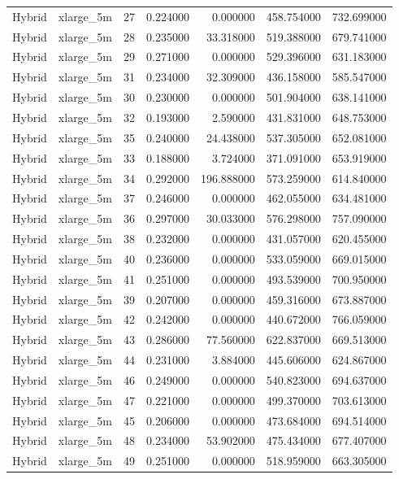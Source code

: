 \begin{tabular}{llrrrrr}
Hybrid & xlarge_5m & 27 & 0.224000 & 0.000000 & 458.754000 & 732.699000 \\
Hybrid & xlarge_5m & 28 & 0.235000 & 33.318000 & 519.388000 & 679.741000 \\
Hybrid & xlarge_5m & 29 & 0.271000 & 0.000000 & 529.396000 & 631.183000 \\
Hybrid & xlarge_5m & 31 & 0.234000 & 32.309000 & 436.158000 & 585.547000 \\
Hybrid & xlarge_5m & 30 & 0.230000 & 0.000000 & 501.904000 & 638.141000 \\
Hybrid & xlarge_5m & 32 & 0.193000 & 2.590000 & 431.831000 & 648.753000 \\
Hybrid & xlarge_5m & 35 & 0.240000 & 24.438000 & 537.305000 & 652.081000 \\
Hybrid & xlarge_5m & 33 & 0.188000 & 3.724000 & 371.091000 & 653.919000 \\
Hybrid & xlarge_5m & 34 & 0.292000 & 196.888000 & 573.259000 & 614.840000 \\
Hybrid & xlarge_5m & 37 & 0.246000 & 0.000000 & 462.055000 & 634.481000 \\
Hybrid & xlarge_5m & 36 & 0.297000 & 30.033000 & 576.298000 & 757.090000 \\
Hybrid & xlarge_5m & 38 & 0.232000 & 0.000000 & 431.057000 & 620.455000 \\
Hybrid & xlarge_5m & 40 & 0.236000 & 0.000000 & 533.059000 & 669.015000 \\
Hybrid & xlarge_5m & 41 & 0.251000 & 0.000000 & 493.539000 & 700.950000 \\
Hybrid & xlarge_5m & 39 & 0.207000 & 0.000000 & 459.316000 & 673.887000 \\
Hybrid & xlarge_5m & 42 & 0.242000 & 0.000000 & 440.672000 & 766.059000 \\
Hybrid & xlarge_5m & 43 & 0.286000 & 77.560000 & 622.837000 & 669.513000 \\
Hybrid & xlarge_5m & 44 & 0.231000 & 3.884000 & 445.606000 & 624.867000 \\
Hybrid & xlarge_5m & 46 & 0.249000 & 0.000000 & 540.823000 & 694.637000 \\
Hybrid & xlarge_5m & 47 & 0.221000 & 0.000000 & 499.370000 & 703.613000 \\
Hybrid & xlarge_5m & 45 & 0.206000 & 0.000000 & 473.684000 & 694.514000 \\
Hybrid & xlarge_5m & 48 & 0.234000 & 53.902000 & 475.434000 & 677.407000 \\
Hybrid & xlarge_5m & 49 & 0.251000 & 0.000000 & 518.959000 & 663.305000 \\

\end{tabular}
